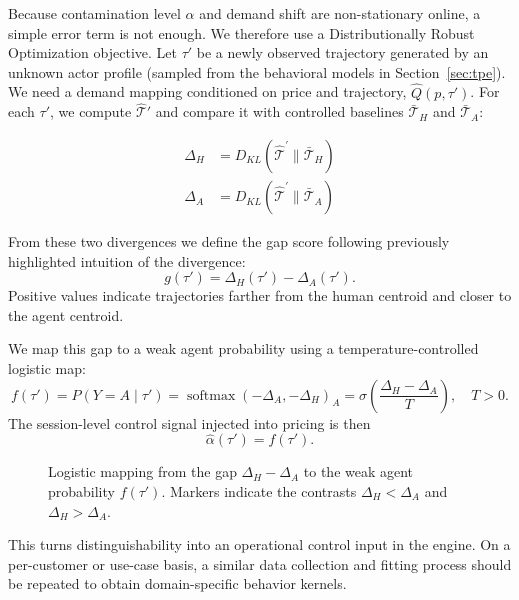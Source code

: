 Because contamination level $\alpha$ and demand shift are non-stationary online, a simple error term is not enough. We therefore use a Distributionally Robust Optimization objective. Let $\tau'$ be a newly observed trajectory generated by an unknown actor profile (sampled from the behavioral models in Section~\ref{sec:tpe}). We need a demand mapping conditioned on price and trajectory, $\hat{Q}(p,\tau')$. For each $\tau'$, we compute $\hat{\mathcal{T}}'$ and compare it with controlled baselines $\bar{\mathcal{T}}_H$ and $\bar{\mathcal{T}}_A$:

\begin{align}
  \label{eq:delta_H}
  \Delta_H &= D_{KL}(\hat{\mathcal{T}}^\prime \parallel \bar{\mathcal{T}}_H) \\
  \label{eq:delta_A}
  \Delta_A &= D_{KL}(\hat{\mathcal{T}}^\prime \parallel \bar{\mathcal{T}}_A)
\end{align}

From these two divergences we define the gap score following previously highlighted intuition of the divergence:
\begin{equation}
g(\tau') = \Delta_H(\tau') - \Delta_A(\tau').
\end{equation}
Positive values indicate trajectories farther from the human centroid and closer to the agent centroid.

We map this gap to a weak agent probability using a temperature-controlled logistic map:
\begin{equation}
f(\tau') = P(Y=A\mid\tau') = \operatorname{softmax}(-\Delta_A,-\Delta_H)_A = \sigma\left(\frac{\Delta_H-\Delta_A}{T}\right), \quad T>0.
\end{equation}
The session-level control signal injected into pricing is then
\begin{equation}
\hat{\alpha}(\tau') = f(\tau').
\end{equation}

\begin{figure}[ht]
  \centering
  
  \caption{Logistic mapping from the gap $\Delta_H-\Delta_A$ to the weak agent probability $f(\tau')$. Markers indicate the contrasts $\Delta_H<\Delta_A$ and $\Delta_H>\Delta_A$.}
  \label{fig:sigmoid_softmax_gap}
\end{figure}

This turns distinguishability into an operational control input in the engine. On a per-customer or use-case basis, a similar data collection and fitting process should be repeated to obtain domain-specific behavior kernels.

